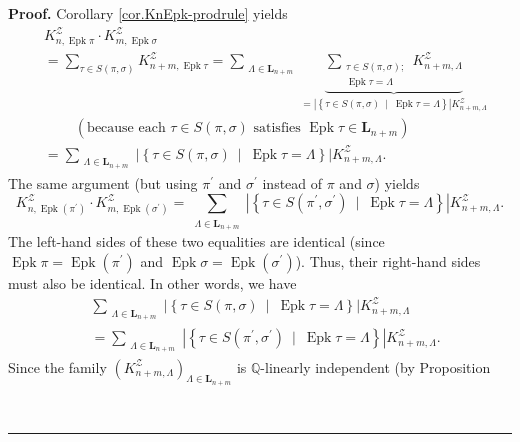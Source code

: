 \documentclass[numbers=enddot,12pt,final,onecolumn,notitlepage]{scrartcl}%
\theoremstyle{definition}
\newenvironment{proof}[1][Proof]{\noindent\textbf{#1.} }{\ \rule{0.5em}{0.5em}}
\let\sumnonlimits\sum
\renewcommand{\sum}{\sumnonlimits\limits}
\begin{document}
\begin{proof}
Corollary \ref{cor.KnEpk-prodrule} yields
\begin{align*}
&  K_{n,\operatorname{Epk} \pi   }^{\mathcal{Z}}\cdot
K_{m,\operatorname{Epk} \sigma   }^{\mathcal{Z}}\\
&  =\sum_{\tau\in S\left(  \pi,\sigma\right)  }K_{n+m,\operatorname{Epk}\tau
}^{\mathcal{Z}}=\sum_{\substack{\Lambda\in\mathbf{L}_{n+m}}}\underbrace{\sum
_{\substack{\tau\in S\left(  \pi,\sigma\right)  ;\\
\operatorname{Epk} \tau=\Lambda}} K_{n+m,\Lambda}^{\mathcal{Z}}
}_{=\left\vert \left\{  \tau\in
S\left(  \pi,\sigma\right)  \ \mid\ \operatorname{Epk}\tau=\Lambda\right\}
\right\vert K_{n+m,\Lambda}^{\mathcal{Z}}}\\
&  \ \ \ \ \ \ \ \ \ \ \left(  \text{because each }\tau\in S\left(  \pi
,\sigma\right)  \text{ satisfies }\operatorname{Epk}\tau\in\mathbf{L}%
_{n+m}\right)  \\
&  =\sum_{\substack{\Lambda\in\mathbf{L}_{n+m}}}\left\vert \left\{  \tau\in
S\left(  \pi,\sigma\right)  \ \mid\ \operatorname{Epk}\tau=\Lambda\right\}
\right\vert K_{n+m,\Lambda}^{\mathcal{Z}}.
\end{align*}
The same argument (but using $\pi^{\prime}$ and $\sigma^{\prime}$ instead
of $\pi$ and $\sigma$) yields
\[
K_{n,\operatorname{Epk}\left(  \pi^{\prime}\right)  }^{\mathcal{Z}}\cdot
K_{m,\operatorname{Epk}\left(  \sigma^{\prime}\right)  }^{\mathcal{Z}}%
=\sum_{\substack{\Lambda\in\mathbf{L}_{n+m}}}\left\vert \left\{  \tau\in
S\left(  \pi^{\prime},\sigma^{\prime}\right)
\ \mid\ \operatorname{Epk} \tau=\Lambda\right\}  \right\vert
K_{n+m,\Lambda}^{\mathcal{Z}}.
\]
The left-hand sides of these two equalities are identical (since
$\operatorname{Epk} \pi   =\operatorname{Epk}\left(
\pi^{\prime}\right)  $ and $\operatorname{Epk} \sigma 
=\operatorname{Epk}\left(  \sigma^{\prime}\right)  $). Thus, their right-hand
sides must also be identical. In other words, we have%
\begin{align*}
&  \sum_{\substack{\Lambda\in\mathbf{L}_{n+m}}}\left\vert \left\{  \tau\in
S\left(  \pi,\sigma\right)  \ \mid\ \operatorname{Epk}\tau=\Lambda\right\}
\right\vert K_{n+m,\Lambda}^{\mathcal{Z}}\\
&  =\sum_{\substack{\Lambda\in\mathbf{L}_{n+m}}}\left\vert \left\{  \tau\in
S\left(  \pi^{\prime},\sigma^{\prime}\right)
\ \mid\ \operatorname{Epk} \tau =\Lambda\right\}
\right\vert K_{n+m,\Lambda}^{\mathcal{Z}}.
\end{align*}
Since the family $\left(  K_{n+m,\Lambda}^{\mathcal{Z}}\right)  _{\Lambda
\in\mathbf{L}_{n+m}}$ is $\mathbb{Q}$-linearly independent (by Proposition

\end{proof}
\end{document}
